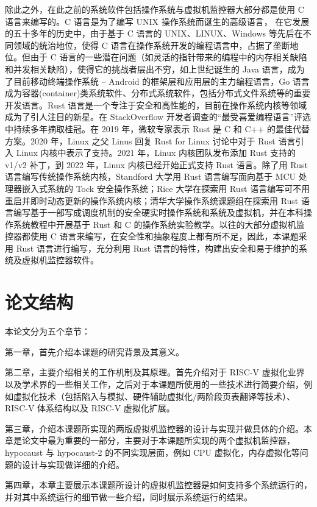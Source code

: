 除此之外，在此之前的系统软件包括操作系统与虚拟机监控器大部分都是使用 C 语言来编写的。C 语言是为了编写 UNIX 操作系统而诞生的高级语言，
在它发展的五十多年的历史中，由于基于 C 语言的 UNIX、LINUX、Windows 等先后在不同领域的统治地位，使得 C 语言在操作系统开发的编程语言中，占据了垄断地位。但由于 C 语言的一些潜在问题（如灵活的指针带来的编程中的内存相关缺陷和并发相关缺陷），使得它的挑战者层出不穷，如上世纪诞生的 Java 语言，成为了目前移动终端操作系统 -- Android 的框架层和应用层的主力编程语言，Go 语言成为容器(container)类系统软件、分布式系统软件，包括分布式文件系统等的重要开发语言。Rust 语言是一个专注于安全和高性能的，目前在操作系统内核等领域成为了引人注目的新星。在 StackOverflow 开发者调查的“最受喜爱编程语言”评选中持续多年摘取桂冠。在 2019 年，微软专家表示 Rust 是 C 和 C++ 的最佳代替方案。2020 年，Linux 之父 Linus 回复 Rust for Linux 讨论中对于 Rust 语言引入 Linux 内核中表示了支持。2021 年，Linux 内核团队发布添加 Rust 支持的 v1/v2 补丁，到 2022 年，Linux 内核已经开始正式支持 Rust 语言。除了用 Rust 语言编写传统操作系统内核，Standford 大学用 Rust 语言编写面向基于 MCU 处理器嵌入式系统的 Tock 安全操作系统；Rice 大学在探索用 Rust 语言编写可不用重启并即时动态更新的操作系统内核；清华大学操作系统课题组在探索用 Rust 语言编写基于一部写成调度机制的安全硬实时操作系统和系统及虚拟机，并在本科操作系统教程中开展基于 Rust 和 C 的操作系统实验教学。以往的大部分虚拟机监控器都使用 C 语言来编写，在安全性和抽象程度上都有所不足，因此，本课题采用 Rust 语言进行编写，充分利用 Rust 语言的特性，构建出安全和易于维护的系统及虚拟机监控器软件。

\section{论文结构}
本论文分为五个章节：  

第一章，首先介绍本课题的研究背景及其意义。

第二章，主要介绍相关的工作机制及其原理。首先介绍对于 RISC-V 虚拟化业界以及学术界的一些相关工作，之后对于本课题所使用的一些技术进行简要介绍，例如虚拟化技术（包括陷入与模拟、硬件辅助虚拟化/两阶段页表翻译等技术）、RISC-V 体系结构以及 RISC-V 虚拟化扩展。 

第三章，介绍本课题所实现的两版虚拟机监控器的设计与实现并做具体的介绍。本章是论文中最为重要的一部分，主要对于本课题所实现的两个虚拟机监控器，hypocaust 与 hypocaust-2 的不同实现层面，例如 CPU 
虚拟化，内存虚拟化等问题的设计与实现做详细的介绍。

第四章，本章主要展示本课题所设计的虚拟机监控器是如何支持多个系统运行的，并对其中系统运行的细节做一些介绍，同时展示系统运行的结果。

